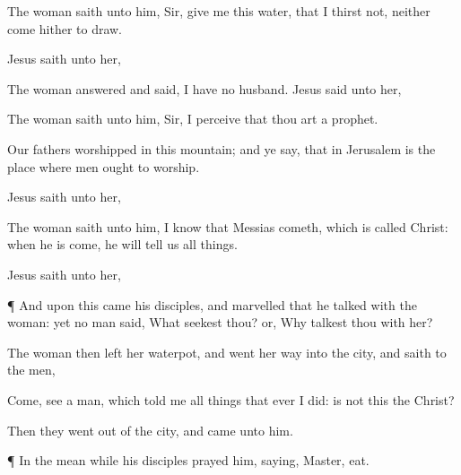 {The
woman
saith
unto
him,
Sir,
give
me
this
water,
that I
thirst
not,
neither
come
hither to
draw.

Jesus
saith unto
her,
{}

The
woman
answered
and
said, I
have
no
husband.
Jesus
said unto
her,
{}


The
woman
saith unto
him,
Sir, I
perceive
that
thou
art a
prophet.

Our
fathers
worshipped
in
this
mountain;
and
ye
say,
that
in
Jerusalem
is the
place
where men
ought to
worship.

Jesus
saith unto
her,
{}




The
woman
saith unto
him, I
know
that
Messias
cometh, which is
called
Christ:
when
he is
come, he will
tell
us all
things.

Jesus
saith unto
her,
{}


\par }{\PP {}¶
And
upon
this
came
his
disciples,
and
marvelled
that he
talked
with the
woman:
yet no
man
said,
What seekest
thou?
or,
Why talkest
thou
with
her?

The
woman
then
left
her
waterpot,
and went her
way
into the
city,
and
saith to the
men,

Come,
see a
man,
which
told
me all
things that
ever I
did:
is
not
this the
Christ?

Then they went
out
of the
city,
and
came
unto
him.


\par }{\PP {}¶
In the mean
while his
disciples
prayed
him,
saying,
Master,
eat.

}

